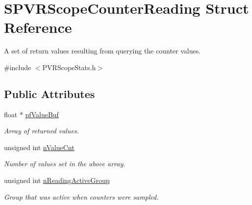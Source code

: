 \hypertarget{struct_s_p_v_r_scope_counter_reading}{\section{S\+P\+V\+R\+Scope\+Counter\+Reading Struct Reference}
\label{struct_s_p_v_r_scope_counter_reading}
}


A set of return values resulting from querying the counter values.  




{\ttfamily \#include $<$P\+V\+R\+Scope\+Stats.\+h$>$}

\subsection*{Public Attributes}
\begin{DoxyCompactItemize}
\item 
\hypertarget{struct_s_p_v_r_scope_counter_reading_a110546f680690b803181a177c9b86a2f}{float $\ast$ \hyperlink{struct_s_p_v_r_scope_counter_reading_a110546f680690b803181a177c9b86a2f}{pf\+Value\+Buf}}\label{struct_s_p_v_r_scope_counter_reading_a110546f680690b803181a177c9b86a2f}

\begin{DoxyCompactList}\small\item\em Array of returned values. \end{DoxyCompactList}\item 
\hypertarget{struct_s_p_v_r_scope_counter_reading_ad191aca5c594484390269802202eb78b}{unsigned int \hyperlink{struct_s_p_v_r_scope_counter_reading_ad191aca5c594484390269802202eb78b}{n\+Value\+Cnt}}\label{struct_s_p_v_r_scope_counter_reading_ad191aca5c594484390269802202eb78b}

\begin{DoxyCompactList}\small\item\em Number of values set in the above array. \end{DoxyCompactList}\item 
\hypertarget{struct_s_p_v_r_scope_counter_reading_a3fbe5a94610ddcbb4457ad901551743e}{unsigned int \hyperlink{struct_s_p_v_r_scope_counter_reading_a3fbe5a94610ddcbb4457ad901551743e}{n\+Reading\+Active\+Group}}\label{struct_s_p_v_r_scope_counter_reading_a3fbe5a94610ddcbb4457ad901551743e}

\begin{DoxyCompactList}\small\item\em Group that was active when counters were sampled. \end{DoxyCompactList}\end{DoxyCompactItemize}


